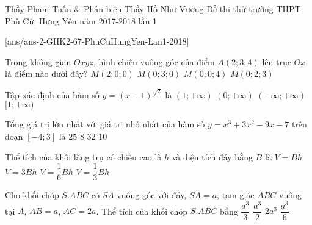 \begin{name}
{Thầy Phạm Tuấn \& Phản biện Thầy Hồ Như Vương}
{Đề thi thử trường THPT Phù Cừ, Hưng Yên năm 2017-2018 lần 1}
\end{name}
\setcounter{ex}{0}
[ans/ans-2-GHK2-67-PhuCuHungYen-Lan1-2018]
\begin{ex}%
Trong không gian $Oxyz$, hình chiếu vuông góc của điểm $A(2;3;4)$  lên trục $Ox$ là điểm nào dưới đây?
\choice
{\True $M(2;0;0)$}
{$M(0;3;0)$}
{$M(0;0;4)$}
{$M(0;2;3)$}
\end{ex}

\begin{ex}%
Tập xác định của hàm số $y=(x-1)^{\sqrt{2}}$ là
\choice
{\True $(1;+\infty)$}
{$(0;+\infty)$}
{$(-\infty;+\infty)$}
{$[1;+\infty)$}
\end{ex}

\begin{ex}%
Tổng giá trị lớn nhất với giá trị nhỏ nhất của hàm số $y=x^3+3x^2-9x-7$ trên đoạn $[-4;3]$ là
\choice
{$25$}
{\True $8$}
{$32$}
{$10$}
\end{ex}

\begin{ex}%
Thể tích của khối lăng trụ có chiều cao là $h$ và diện tích đáy bằng $B$ là
\choice
{\True $V=Bh$}
{$V=3Bh$}
{$V=\dfrac{1}{6} Bh$}
{$V=\dfrac{1}{3} Bh$}
\loigiai{

}
\end{ex}

\begin{ex}%
Cho khối chóp $S.ABC$ có $SA$ vuông góc với đáy, $SA=a$, tam giác $ABC$ vuông tại $A$, $AB=a$, $AC=2a$. Thể tích của khối chóp $S.ABC$ bằng
\choice
{\True $\dfrac{a^3}{3}$}
{$\dfrac{a^3}{2}$}
{$2a^3$}
{$\dfrac{a^3}{6}$}
\end{ex}

